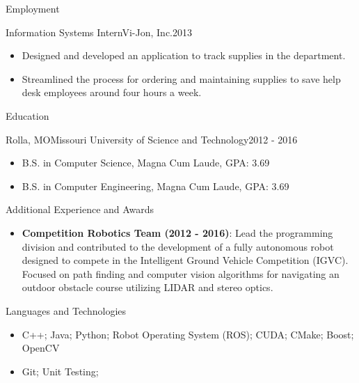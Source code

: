 \documentclass[]{mcdowellcv}
\begin{document}
\begin{cvsection}{Employment}
\begin{vijon}
        \begin{cvsubsection}{Information Systems Intern}{Vi-Jon, Inc.}{2013}
            \begin{itemize}
                \item Designed and developed an application to track supplies in the department.
                \item Streamlined the process for ordering and maintaining supplies to save help desk employees around four hours a week.
            \end{itemize}
        \end{cvsubsection}
\end{vijon}

    \end{cvsection}
    
    \begin{cvsection}{Education}
        \begin{cvsubsection}[2]{Rolla, MO}{Missouri University of Science and Technology}{2012 - 2016}
            \begin{itemize}
                \item B.S. in Computer Science, Magna Cum Laude, GPA: 3.69
                \item B.S. in Computer Engineering, Magna Cum Laude, GPA: 3.69
            \end{itemize}
        \end{cvsubsection}
    \end{cvsection} 
    
    \begin{cvsection}{Additional Experience and Awards}
        \begin{cvsubsection}{}{}{}  
            \begin{itemize} 
                \item \textbf{Competition Robotics Team (2012 - 2016)}: Lead the programming division and contributed to the development of a fully autonomous robot designed to compete in the Intelligent Ground Vehicle Competition (IGVC). Focused on path finding and computer vision algorithms for navigating an outdoor obstacle course utilizing LIDAR and stereo optics.
            \end{itemize}
        \end{cvsubsection}
    \end{cvsection}
    
    \begin{cvsection}{Languages and Technologies}
        \begin{cvsubsection}{}{}{}  
            \begin{itemize}
                \item C++; Java; Python; Robot Operating System (ROS); CUDA; CMake; Boost; OpenCV 
                \item Git; Unit Testing;
            \end{itemize}
        \end{cvsubsection}
    \end{cvsection}
    
\end{document}
